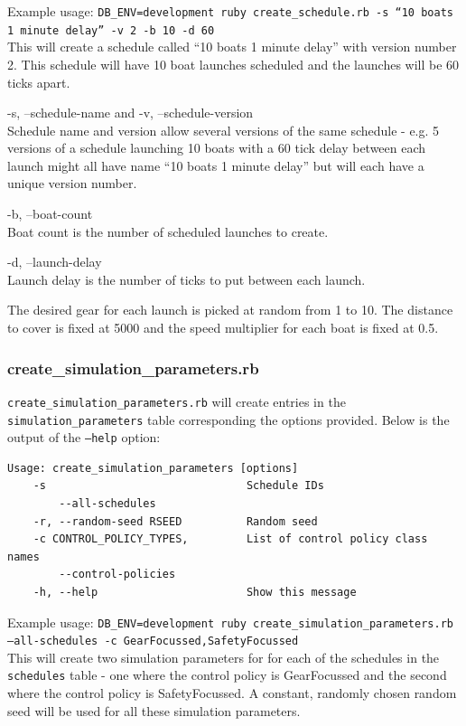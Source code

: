 Example usage: \texttt{DB\_ENV=development ruby create\_schedule.rb -s ``10 boats 1 minute delay'' -v 2 -b 10 -d 60} \\
This will create a schedule called ``10 boats 1 minute delay'' with version number 2. This schedule will have 10 boat launches scheduled and the launches will be 60 ticks apart.

\begin{description}
\item -s, --schedule-name and -v, --schedule-version\\
  Schedule name and version allow several versions of the same schedule - e.g. 5 versions of a schedule launching 10 boats with a 60 tick delay between each launch might all have name ``10 boats 1 minute delay'' but will each have a unique version number.

\item -b, --boat-count\\
  Boat count is the number of scheduled launches to create.
  
\item -d, --launch-delay\\  
  Launch delay is the number of ticks to put between each launch.
\end{description}
The desired gear for each launch is picked at random from 1 to 10. The distance to cover is fixed at 5000 and the speed multiplier for each boat is fixed at 0.5.

\subsubsection*{create\_simulation\_parameters.rb}

\texttt{create\_simulation\_parameters.rb} will create entries in the \texttt{simulation\_parameters} table corresponding the options provided. Below is the output of the \texttt{--help} option:

\begin{lstlisting}[basicstyle=\ttfamily]
Usage: create_simulation_parameters [options]
    -s                               Schedule IDs
        --all-schedules
    -r, --random-seed RSEED          Random seed
    -c CONTROL_POLICY_TYPES,         List of control policy class names
        --control-policies
    -h, --help                       Show this message
\end{lstlisting}

Example usage: \texttt{DB\_ENV=development ruby create\_simulation\_parameters.rb --all-schedules -c GearFocussed,SafetyFocussed} \\
This will create two simulation parameters for for each of the schedules in the \texttt{schedules} table - one where the control policy is GearFocussed and the second where the control policy is SafetyFocussed. A constant, randomly chosen random seed will be used for all these simulation parameters.

